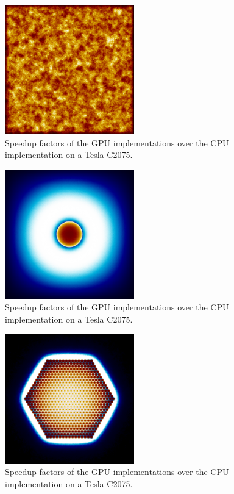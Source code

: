 \begin{figure}[h!] 
  \centering
    \includegraphics[width=0.5\textwidth]{graphics/finalresults/serpent-benchmark-6/homfuel_mesh1.png}
     \caption{Speedup factors of the GPU implementations over the CPU implementation on a Tesla C2075. \label{serp_homfuel_mesh} }
\end{figure}

\begin{figure}[h!] 
  \centering
    \includegraphics[width=0.5\textwidth]{graphics/finalresults/serpent-benchmark-6/pincell_mesh1.png}
     \caption{Speedup factors of the GPU implementations over the CPU implementation on a Tesla C2075. \label{serp_pincell_mesh} }
\end{figure}

\begin{figure}[h!] 
  \centering
    \includegraphics[width=0.5\textwidth]{graphics/finalresults/serpent-benchmark-6/assembly_mesh1.png}
     \caption{Speedup factors of the GPU implementations over the CPU implementation on a Tesla C2075. \label{serp_assembly_mesh} }
\end{figure}

